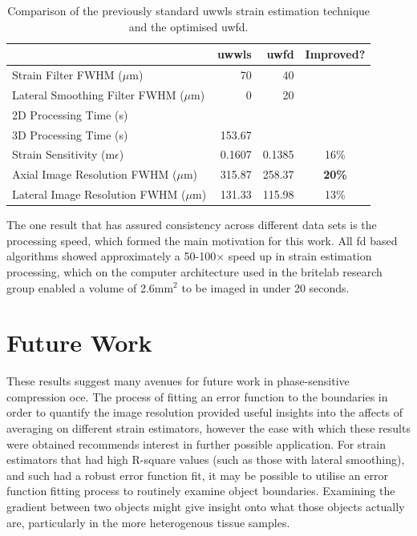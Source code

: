 \begin{table}[h]
	\begin{tabularx}{\textwidth}{Yrrc}
		\toprule
		& \textbf{\ac{uwwls}} & \textbf{\ac{uwfd}} & \textbf{Improved?}\\
		\midrule 
		Strain Filter FWHM ($\mu$m) & 70 & 40 \\
		Lateral Smoothing Filter FWHM ($\mu$m) & 0 & 20 \\
		\midrule
		2D Processing Time (s) & & \\
		3D Processing Time (s) & 153.67 & \\
		Strain Sensitivity (m$\epsilon$) & 0.1607 & 0.1385 & 16\% \\
		Axial Image Resolution FWHM ($\mu$m) & 315.87 & 258.37 & \textbf{20\%} \\
		Lateral Image Resolution FWHM ($\mu$m) & 131.33 & 115.98 & 13\% \\
		\bottomrule
	\end{tabularx}
	\caption{Comparison of the previously standard \ac{uwwls} strain estimation technique and the optimised \ac{uwfd}.}
	\label{comparison_table}
\end{table}

The one result that has assured consistency across different data sets is the processing speed, which formed the main motivation for this work. All \ac{fd} based algorithms showed approximately a 50-100$\times$ speed up in strain estimation processing, which on the computer architecture used in the \ac{britelab} research group enabled a volume of 2.6$\text{mm}^2$ to be imaged in under 20 seconds.

\section{Future Work}

These results suggest many avenues for future work in phase-sensitive compression \ac{oce}. The process of fitting an error function to the boundaries in order to quantify the image resolution provided useful insights into the affects of averaging on different strain estimators, however the ease with which these results were obtained recommends interest in further possible application. For strain estimators that had high R-square values (such as those with lateral smoothing), and such had a robust error function fit, it may be possible to utilise an error function fitting process to routinely examine object boundaries. Examining the gradient between two objects might give insight onto what those objects actually are, particularly in the more heterogenous tissue samples. 

